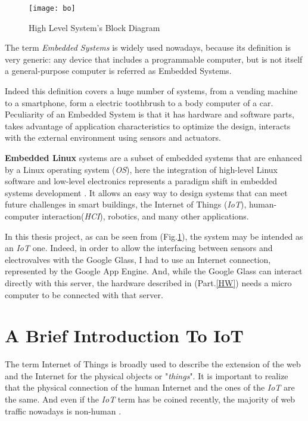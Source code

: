 \begin{figure}[h]
	\centering
	\texttt{[image: bo]}
	\caption{High Level System's Block Diagram}
	\label{Fig:logicalview}
	
\end{figure}

The term \textit{Embedded Systems} is widely used nowadays, because its definition is  very generic: any device that includes a programmable computer, but is not itself a general-purpose computer is referred as Embedded Systems.

Indeed this definition covers a huge number of systems, from  a vending machine to a smartphone, form a electric toothbrush to a body computer of a car.\\
Peculiarity of an Embedded System is that it has hardware and software parts, takes advantage of application characteristics to optimize the design, interacts with the external environment using sensors and actuators.

\textbf{Embedded Linux} systems are a subset of embedded systems that are enhanced by a Linux operating system (\textit{OS}), here the integration of high-level Linux software and low-level electronics represents a paradigm shift in embedded systems development \cite{EBB}. It allows an easy way to design systems that can meet future challenges in smart buildings, the Internet of Things (\textit{IoT}), human-computer interaction(\textit{HCI}), robotics, and many other applications.

In this thesis project, as can be seen from (Fig.\ref{Fig:logicalview}), the system may be intended as an \textit{IoT} one. Indeed, in order to allow the interfacing between sensors and electrovalves with the Google Glass, I had to use an Internet connection, represented by the Google App Engine. And, while the Google Glass can interact directly with this server, the hardware described in (Part.\ref{HW}) needs a micro computer to be connected with that server.

\section{A Brief Introduction To IoT} 

The term Internet of Things is broadly used to describe the extension of the web and the Internet for the physical objects or "\textit{things}". It is important to realize that the physical connection of the human Internet and the ones of the \textit{IoT} are the same. And even if the \textit{IoT} term has be coined recently, the majority of web traffic nowadays is non-human \cite{ALTIOT}.

